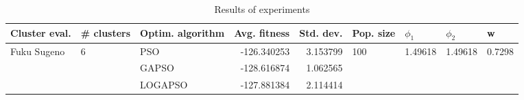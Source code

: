 \begin{table}
\centering
\caption{Results of experiments}
\begin{tabular}{lllrrllll}
\toprule
               Cluster eval. &        \# clusters & Optim. algorithm &  Avg. fitness &  Std. dev. &            Pop. size &               $\phi_{1}$ &               $\phi_{2}$ &                       w \\
\midrule
\multirow{3}{*}{Fuku Sugeno} & \multirow{3}{*}{6} &              PSO &   -126.340253 &   3.153799 & \multirow{3}{*}{100} & \multirow{3}{*}{1.49618} & \multirow{3}{*}{1.49618} & \multirow{3}{*}{0.7298} \\
                             &                    &            GAPSO &   -128.616874 &   1.062565 &                      &                          &                          &                         \\
                             &                    &          LOGAPSO &   -127.881384 &   2.114414 &                      &                          &                          &                         \\
\bottomrule
\end{tabular}
\end{table}
